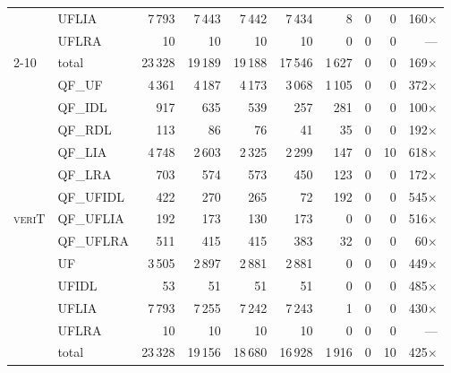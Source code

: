\documentclass[runningheads]{llncs}
\newcommand{\verit}{\textsc{veriT}\xspace}
\begin{document}
\begin{table}[p]
\begin{tabular}{l l r r r @{\quad} r r r r @{\quad} r}
      & UFLIA     &   7\,793 &   7\,443 &   7\,442 &   7\,434 &       8 &  0 &  0 & 160$\times$ \\
      & UFLRA     &       10 &       10 &       10 &       10 &       0 &  0 &  0 & --- \\
    \cmidrule(l){2-10}
      & total     &  23\,328 &  19\,189 &  19\,188 &  17\,546 &  1\,627 &  0 &  0 & 169$\times$ \\
    \midrule
    \multirow{13}{*}{\verit}
      & QF\_UF    &   4\,361 &   4\,187 &   4\,173 &   3\,068 &  1\,105 &  0 &  0 & 372$\times$ \\
      & QF\_IDL   &      917 &      635 &      539 &      257 &     281 &  0 &  0 & 100$\times$ \\
      & QF\_RDL   &      113 &       86 &       76 &       41 &      35 &  0 &  0 & 192$\times$ \\
      & QF\_LIA   &   4\,748 &   2\,603 &   2\,325 &   2\,299 &     147 &  0 & 10 & 618$\times$ \\
      & QF\_LRA   &      703 &      574 &      573 &      450 &     123 &  0 &  0 & 172$\times$ \\
      & QF\_UFIDL &      422 &      270 &      265 &       72 &     192 &  0 &  0 & 545$\times$ \\
      & QF\_UFLIA &      192 &      173 &      130 &      173 &       0 &  0 &  0 & 516$\times$ \\
      & QF\_UFLRA &      511 &      415 &      415 &      383 &      32 &  0 &  0 & 60$\times$ \\
      & UF        &   3\,505 &   2\,897 &   2\,881 &   2\,881 &       0 &  0 &  0 & 449$\times$ \\
      & UFIDL     &       53 &       51 &       51 &       51 &       0 &  0 &  0 & 485$\times$ \\
      & UFLIA     &   7\,793 &   7\,255 &   7\,242 &   7\,243 &       1 &  0 &  0 & 430$\times$ \\
      & UFLRA     &       10 &       10 &       10 &       10 &       0 &  0 &  0 & --- \\
    \cmidrule(l){2-10}
      & total     &  23\,328 &  19\,156 &  18\,680 &  16\,928 &  1\,916 &  0 & 10 & 425$\times$ \\
    \bottomrule
  \end{tabular}
\end{table}
\end{document}
